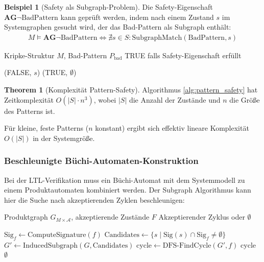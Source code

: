 ﻿\documentclass[a4paper,12pt]{article}
\theoremstyle{definition}
\newtheorem{beispiel}{Beispiel}[section]
\newtheorem{theorem}{Theorem}[section]
\begin{document}
\begin{beispiel}[Safety als Subgraph-Problem]
	Die Safety-Eigenschaft $\mathbf{AG}\neg\text{BadPattern}$ kann geprüft werden, indem nach einem Zustand $s$ im Systemgraphen gesucht wird, der das Bad-Pattern als Subgraph enthält:
	\begin{align}
	M \models \mathbf{AG}\neg\text{BadPattern} \iff \nexists s \in S: \text{SubgraphMatch}(\text{BadPattern}, s)
	\end{align}
\end{beispiel}

\begin{algorithm}[H]
	\caption{Musterbasierte Safety-Prüfung}
	\label{alg:pattern_safety}
	\begin{algorithmic}[1]
		\Eingabe Kripke-Struktur $M$, Bad-Pattern $P_{\text{bad}}$
		\Ausgabe TRUE falls Safety-Eigenschaft erfüllt
		
		 
		 
		\State \Return (FALSE, $s$) 
		\EndeWenn
		\EndeFuer
		\State \Return (TRUE, $\emptyset$)
	\end{algorithmic}
\end{algorithm}

\begin{theorem}[Komplexität Pattern-Safety]
	Algorithmus \ref{alg:pattern_safety} hat Zeitkomplexität $O(|S| \cdot n^3)$, wobei $|S|$ die Anzahl der Zustände und $n$ die Größe des Patterns ist.
\end{theorem}

Für kleine, feste Patterns ($n$ konstant) ergibt sich effektiv lineare Komplexität $O(|S|)$ in der Systemgröße.

\subsubsection{Beschleunigte Büchi-Automaten-Konstruktion}

Bei der LTL-Verifikation muss ein Büchi-Automat mit dem Systemmodell zu einem Produktautomaten kombiniert werden. Der Subgraph Algorithmus kann hier die Suche nach akzeptierenden Zyklen beschleunigen:

\begin{algorithm}[H]
	\caption{Subgraph-beschleunigte Kreiserkennung}
	\label{alg:subgraph_cycle}
	\begin{algorithmic}[1]
		\Eingabe Produktgraph $G_{M \times \mathcal{A}}$, akzeptierende Zustände $F$
		\Ausgabe Akzeptierender Zyklus oder $\emptyset$
		
		 
		\State $\text{Sig}_f \gets \text{ComputeSignature}(f)$
		\State $\text{Candidates} \gets \{s \mid \text{Sig}(s) \cap \text{Sig}_f \neq \emptyset\}$
		\State $G' \gets \text{InducedSubgraph}(G, \text{Candidates})$
		\State $\text{cycle} \gets \text{DFS-FindCycle}(G', f)$ 
		\State \Return $\text{cycle}$
		\EndeWenn
		\EndeFuer
		\State \Return $\emptyset$
	\end{algorithmic}
\end{algorithm}
\end{document}
